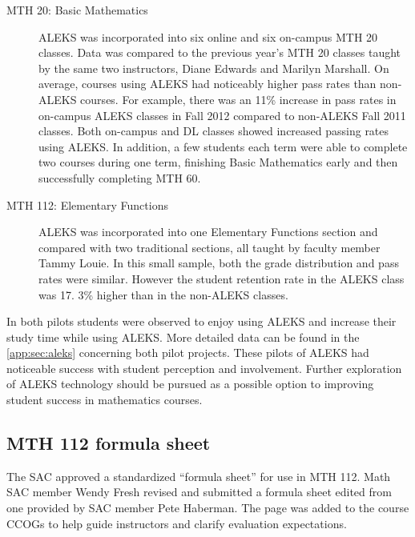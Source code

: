 \begin{description}
	\item[MTH 20: Basic Mathematics] ALEKS was incorporated into six online and six
		on-campus MTH 20 classes.
		Data was compared to the previous year's MTH 20 classes taught by the same two instructors, Diane Edwards and Marilyn Marshall.
		On average, courses using ALEKS had noticeably higher pass rates than non-ALEKS courses.
		For example, there was an 11\% increase in pass rates in on-campus ALEKS classes in Fall 2012 compared to non-ALEKS Fall 2011 classes.
		Both on-campus and DL classes showed increased passing rates using ALEKS.
		In addition, a few students each term were able to complete two courses during one term, finishing Basic Mathematics early and then successfully completing MTH 60.

	\item[MTH 112: Elementary Functions] ALEKS was incorporated into one Elementary
		Functions section and compared with two traditional sections, all taught by
		faculty member Tammy Louie.
		In this small sample, both the grade distribution and pass rates were similar.
		However the student retention rate in the ALEKS class was 17.
		3\% higher than in the non-ALEKS classes.

\end{description}

In both pilots students were observed to enjoy using ALEKS and increase their study time while using ALEKS.
More detailed data can be found in the \vref{app:sec:aleks} concerning both pilot projects.
These pilots of ALEKS had noticeable success with student perception and involvement.
Further exploration of ALEKS technology should be pursued as a possible option to improving student success in mathematics courses.

\subsection{MTH 112 formula sheet}
The SAC approved a standardized ``formula sheet'' for use in MTH 112.
Math SAC member Wendy Fresh revised and submitted a formula sheet edited from one provided by SAC member Pete Haberman.
The page was added to the course CCOGs to help guide instructors and clarify evaluation expectations.

